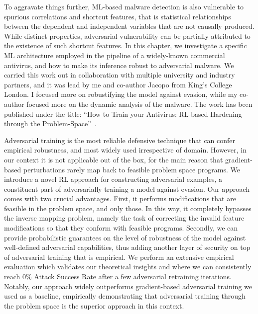 To aggravate things further, ML-based malware detection is also vulnerable to spurious correlations and shortcut features, that is statistical relationships between the dependent and independent variables that are not causally produced.
While distinct properties, adversarial vulnerability can be partially attributed to the existence of such shortcut features.
In this chapter, we investigate a specific ML architecture employed in the pipeline of a widely-known commercial antivirus, and how to make its inference robust to adversarial malware.
We carried this work out in collaboration with multiple university and industry partners, and it was lead by me and co-author Jacopo from King's College London.
I focused more on robustifying the model against evasion, while my co-author focused more on the dynamic analysis of the malware.
The work has been published under the title: ``How to Train your Antivirus: RL-based Hardening through the Problem-Space''~\cite{tsingenopoulos2024train}.

Adversarial training is the most reliable defensive technique that can confer empirical robustness, and most widely used irrespective of domain. 
However, in our context it is not applicable out of the box, for the main reason that gradient-based perturbations rarely map back to feasible problem space programs. 
We introduce a novel \gls{RL} approach for constructing adversarial examples, a constituent part of adversarially training a model against evasion.
Our approach comes with two crucial advantages.
First, it performs modifications that are feasible in the problem space, and only those.
In this way, it completely bypasses the inverse mapping problem, namely the task of correcting the invalid feature modifications so that they conform with feasible programs.
Secondly, we can provide probabilistic guarantees on the level of robustness of the model against well-defined adversarial capabilities, thus adding another layer of security on top of adversarial training that is empirical.
We perform an extensive empirical evaluation which validates our theoretical insights and where we can consistently reach 0\% Attack Success Rate after a few adversarial retraining iterations.
Notably, our approach widely outperforms gradient-based adversarial training we used as a baseline, empirically demonstrating that adversarial training through the problem space is the superior approach in this context.

